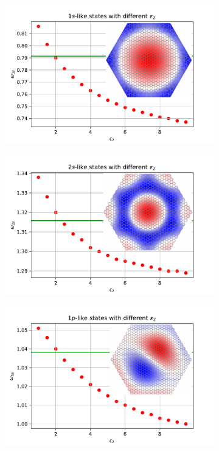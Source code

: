 \begin{figure}[H]
\centering
\begin{subfigure}[b]{.49\textwidth}
  \centering
  \includegraphics[width=\textwidth]{img/1s.pdf}
  \caption{}
  \label{fig:1s}
\end{subfigure}
\hfill
\begin{subfigure}[b]{.49\textwidth}
  \centering
  \includegraphics[width=\textwidth]{img/2s.pdf}
  \caption{}
  \label{fig:2s}
\end{subfigure}
\begin{subfigure}[b]{.49\textwidth}
  \centering
  \includegraphics[width=\textwidth]{img/1p.pdf}

\end{subfigure}
\end{figure}
